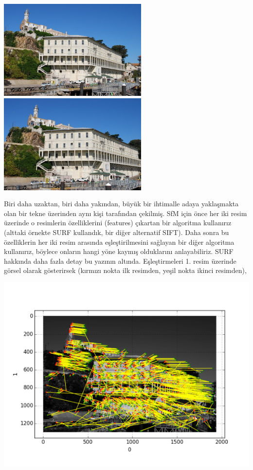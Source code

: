 \documentclass[12pt,fleqn]{article}\usepackage{../../common}
\begin{document}
\includegraphics[height=5cm]{alcatraz1.png}
\includegraphics[height=5cm]{alcatraz2.png}

Biri daha uzaktan, biri daha yakından, büyük bir ihtimalle adaya
yaklaşmakta olan bir tekne üzerinden aynı kişi tarafından çekilmiş. SfM
için önce her iki resim üzerinde o resimlerin özelliklerini (features)
çıkartan bir algoritma kullanırız (alttaki örnekte SURF kullandık, bir
diğer alternatif SIFT). Daha sonra bu özelliklerin her iki resim arasında
eşleştirilmesini sağlayan bir diğer algoritma kullanırız, böylece onların
hangi yöne kaymış olduklarını anlayabiliriz. SURF hakkında daha fazla detay
bu yazının altında. Eşleştirmeleri 1. resim üzerinde görsel olarak
gösterirsek (kırmızı nokta ilk resimden, yeşil nokta ikinci resimden),

\includegraphics[height=10cm]{alcatraz3.png}
\end{document}
